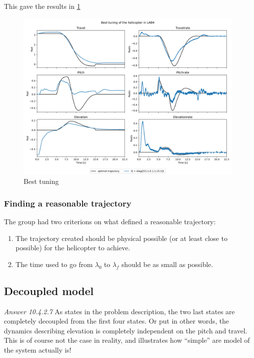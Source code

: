 \documentclass[../main.tex]{subfiles}
\begin{document}
This gave the results in \cref{fig:LAB4_best_tuning}
\begin{figure}[h]
	\centering
	\includegraphics[width=\linewidth]{figures/LAB4_best_tunings.png}
	\caption{Best tuning}
	\label{fig:LAB4_best_tuning}
\end{figure}

\subsubsection{Finding a reasonable trajectory}
The group had two criterions on what defined a reasonable trajectory:
\begin{enumerate}
	\item The trajectory created should be physical possible (or at least close to possible) for the helicopter to achieve.
	\item The time used to go from $ \lambda_0 $ to $ \lambda_f $ should be as small as possible.
\end{enumerate}
 

\subsection{Decoupled model} \label{sec:lab4_decoupled}
\textit{Answer 10.4.2.7}
As states in the problem description, the two last states are completely decoupled from the first four states. Or put in other words, the dynamics describing elevation is completely independent on the pitch and travel. This is of course not the case in reality, and illustrates how ``simple'' are model of the system actually is!
\end{document}
